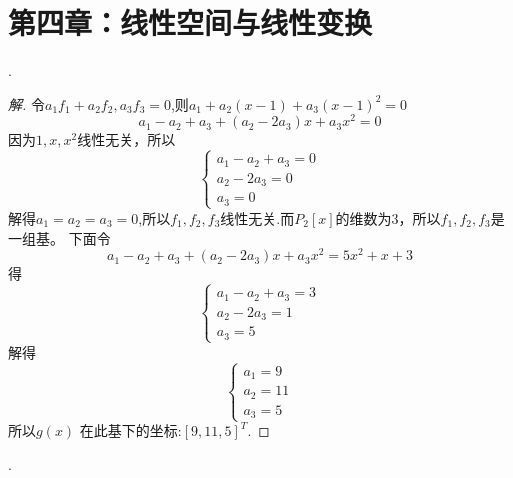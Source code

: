 \documentclass[10pt,a4paper]{report}
\title{}
\author{}
\date{}
\begin{document}
\chapter*{第四章：线性空间与线性变换}
.
\begin{proof}[解]
	令$a_{1}f_{1}+a_{2}f_{2},a_{3}f_{3} = 0$,则$a_{1}+a_{2}(x-1)+a_{3}(x-1)^{2}=0$\\
	$$a_{1}-a_{2}+a_{3}+(a_{2}-2a_{3})x+a_{3}x^{2} = 0$$
	因为$1,x,x^{2}$线性无关，所以
	$$
	\left\{
	\begin{aligned}
	a_{1}-a_{2}+a_{3}=0 \\
	a_{2}-2a_{3}=0 \\
	a_{3}=0 
	\end{aligned}
	\right. 
	$$
	解得$a_{1}=a_{2}=a_{3}=0$,所以$f_{1},f_{2},f_{3}$线性无关.而$P_{2}[x]$的维数为3，所以$f_{1},f_{2},f_{3}$是一组基。
	下面令
	$$a_{1}-a_{2}+a_{3}+(a_{2}-2a_{3})x+a_{3}x^{2} = 5x^{2}+x+3$$
	得
	$$
	\left\{
	\begin{aligned}
	a_{1}-a_{2}+a_{3}=3 \\
	a_{2}-2a_{3}=1 \\
	a_{3}=5 
	\end{aligned}
	\right. 
	$$
	解得$$
	\left\{
	\begin{aligned}
	a_{1}=9 \\
	a_{2}=11 \\
	a_{3}=5 
	\end{aligned}
	\right. 
	$$
	所以$g(x)$ 在此基下的坐标:$[9,11,5]^{T}$.
\end{proof}
.
\end{document}
